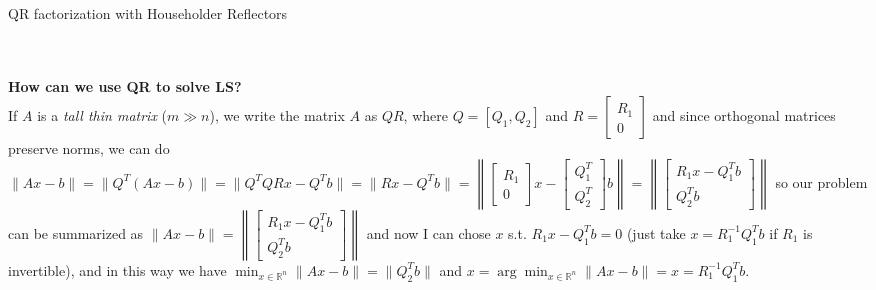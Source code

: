 \documentclass{article}
\begin{document}
\makeatletter
\def\BState{\State\hskip-\ALG@thistlm}
\makeatother
\begin{algorithm}
\caption{QR factorization with Householder Reflectors}\label{euclid}
\end{algorithm}
\\\\\textbf{How can we use QR to solve LS?}\\
If $A$ is a \textit{tall thin matrix} ($m \gg n$), we write the matrix $A$ as $QR$, where
$Q = [Q_1, Q_2]$ and
$R = \begin{bmatrix}R_{1} \\ 0\end{bmatrix}$ and since orthogonal matrices preserve norms, we can do
$\|Ax - b\| = \|Q^{T}(Ax-b)\| =
\|Q^{T}QRx - Q^{T}b\| =
\|Rx - Q^{T}b\| =
\left\lVert\begin{bmatrix}R_{1} \\ 0\end{bmatrix}x - \begin{bmatrix}Q_{1}^T \\ Q_{2}^T\end{bmatrix}b\right\rVert =
\left\lVert\begin{bmatrix}R_{1}x - Q_{1}^{T}b \\ Q_{2}^{T}b\end{bmatrix}\right\rVert$
so our problem can be summarized as
$\|Ax - b\| =
\left\lVert \begin{bmatrix} R_{1}x - Q_{1}^{T}b \\ Q_{2}^{T}b\end{bmatrix} \right\lVert$
and now I can chose $x$ s.t. $R_{1}x - Q_{1}^{T}b = 0$ (just take $x = R_{1}^{-1}Q_{1}^{T}b$ if $R_{1}$ is invertible), and in this way we have $\min_{x \in  \mathds{R}^n}\|Ax - b\| = \|Q_{2}^{T}b\|$ and $x  = \arg\!\min_{x \in  \mathds{R}^n}\|Ax - b\| = x = R_{1}^{-1}Q_{1}^{T}b$.
\end{document}
